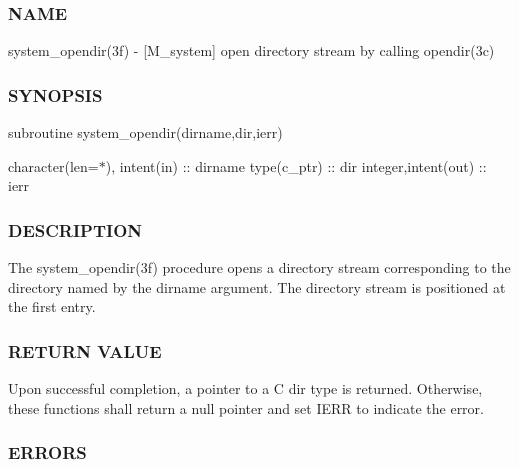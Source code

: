 \subsubsection*{N\+A\+ME}

system\+\_\+opendir(3f) -\/ \mbox{[}M\+\_\+system\mbox{]} open directory stream by calling opendir(3c) \subsubsection*{S\+Y\+N\+O\+P\+S\+IS}

subroutine system\+\_\+opendir(dirname,dir,ierr)

character(len=$\ast$), intent(in) \+:\+: dirname type(c\+\_\+ptr) \+:\+: dir integer,intent(out) \+:\+: ierr

\subsubsection*{D\+E\+S\+C\+R\+I\+P\+T\+I\+ON}

The system\+\_\+opendir(3f) procedure opens a directory stream corresponding to the directory named by the dirname argument. The directory stream is positioned at the first entry.

\subsubsection*{R\+E\+T\+U\+RN V\+A\+L\+UE}

Upon successful completion, a pointer to a C dir type is returned. Otherwise, these functions shall return a null pointer and set I\+E\+RR to indicate the error.

\subsubsection*{E\+R\+R\+O\+RS}

